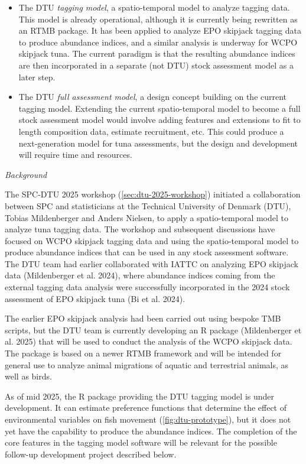 \documentclass{SCreport}
\begin{document}
\begin{itemize}
  \item The DTU \emph{tagging model}, a spatio-temporal model to analyze tagging
  data. This model is already operational, although it is currently being
  rewritten as an RTMB package. It has been applied to analyze EPO skipjack
  tagging data to produce abundance indices, and a similar analysis is underway
  for WCPO skipjack tuna. The current paradigm is that the resulting abundance
  indices are then incorporated in a separate (not DTU) stock assessment model
  as a later step.
  \item The DTU \emph{full assessment model}, a design concept building on the
  current tagging model. Extending the current spatio-temporal model to become a
  full stock assessment model would involve adding features and extensions to
  fit to length composition data, estimate recruitment, etc. This could produce
  a next-generation model for tuna assessments, but the design and development
  will require time and resources.
\end{itemize}

\vspace{2ex}

\textit{Background}

The SPC-DTU 2025 workshop (\autoref{sec:dtu-2025-workshop}) initiated a
collaboration between SPC and statisticians at the Technical University of
Denmark (DTU), Tobias Mildenberger and Anders Nielsen, to apply a
spatio-temporal model to analyze tuna tagging data. The workshop and subsequent
discussions have focused on WCPO skipjack tagging data and using the
spatio-temporal model to produce abundance indices that can be used in any stock
assessment software. The DTU team had earlier collaborated with IATTC on
analyzing EPO skipjack data (Mildenberger et al. 2024), where abundance indices
coming from the external tagging data analysis were successfully incorporated in
the 2024 stock assessment of EPO skipjack tuna (Bi et al. 2024).

The earlier EPO skipjack analysis had been carried out using bespoke TMB
scripts, but the DTU team is currently developing an R package (Mildenberger et
al. 2025) that will be used to conduct the analysis of the WCPO skipjack data.
The package is based on a newer RTMB framework and will be intended for general
use to analyze animal migrations of aquatic and terrestrial animals, as well as
birds.

As of mid 2025, the R package providing the DTU tagging model is under
development. It can estimate preference functions that determine the effect of
environmental variables on fish movement (\autoref{fig:dtu-prototype}), but it
does not yet have the capability to produce the abundance indices. The
completion of the core features in the tagging model software will be relevant
for the possible follow-up development project described below.
\end{document}
